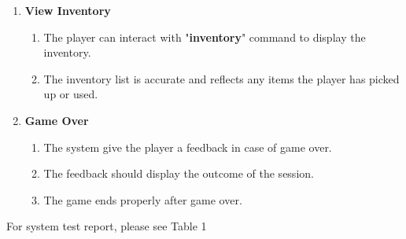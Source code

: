 \documentclass{article}
\begin{document}
\begin{enumerate}
    \item \textbf{View Inventory}
\begin{enumerate}
    \item The player can interact with "\textbf{inventory}" command to display the inventory.
    \item The inventory list is accurate and reflects any items the player has picked up or used.
\end{enumerate}

\item \textbf{Game Over}
\begin{enumerate}
    \item The system give the player a feedback in case of game over.
    \item The feedback should display the outcome of the session.
    \item The game ends properly after game over.
\end{enumerate}

\end{enumerate}

For system test report, please see Table 1
\end{document}
